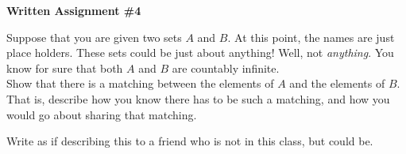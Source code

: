 \documentclass[12pt,letterpaper]{article}
\begin{document}
\setlength{\parskip}{1ex plus 0.5ex minus 0.2ex}
\setlength{\parindent}{0pt}

\pagestyle{fancy}
\lfoot{}
\rfoot{}

\begin{center}
{
\Large
\textbf{Written Assignment \#4}
}
\end{center}

Suppose that you are given two sets $A$ and $B$.
At this point, the names are just place holders. 
These sets could be just about anything!
Well, not \emph{anything}.
You know for sure that both $A$ and $B$ are countably infinite.\\

Show that there is a matching between the elements of $A$ and the elements of $B$.
That is, describe how you know there has to be such a matching, and how you would go about sharing that matching.

Write as if describing this to a friend who is not in this class, but could be.
\end{document}
